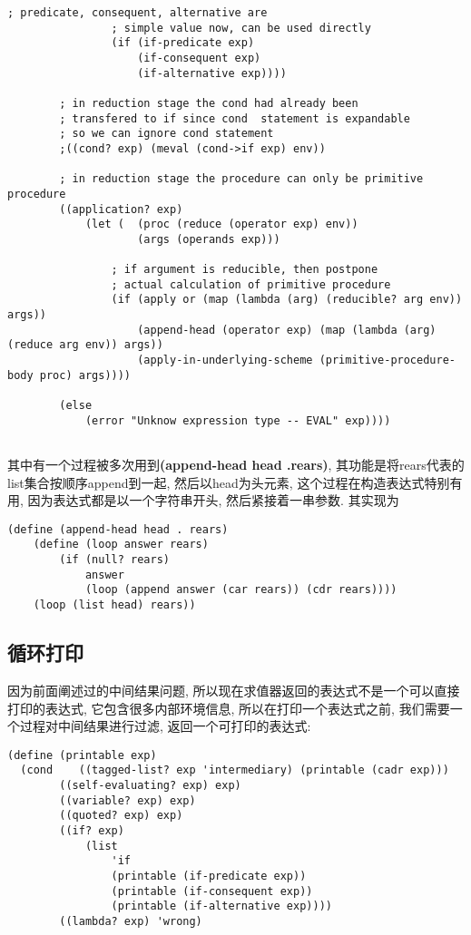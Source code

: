 \documentclass{article}
\begin{document}
\begin{CJK*}{UTF8}{gkai}
\begin{lstlisting}[basicstyle=\scriptsize\ttfamily\bfseries]
                ; predicate, consequent, alternative are 
                ; simple value now, can be used directly
                (if (if-predicate exp)
                    (if-consequent exp)
                    (if-alternative exp))))
                            
        ; in reduction stage the cond had already been 
        ; transfered to if since cond  statement is expandable
        ; so we can ignore cond statement
        ;((cond? exp) (meval (cond->if exp) env))
        
        ; in reduction stage the procedure can only be primitive procedure
        ((application? exp)
            (let (  (proc (reduce (operator exp) env))
                    (args (operands exp)))

                ; if argument is reducible, then postpone 
                ; actual calculation of primitive procedure
                (if (apply or (map (lambda (arg) (reducible? arg env)) args))
                    (append-head (operator exp) (map (lambda (arg) (reduce arg env)) args))
                    (apply-in-underlying-scheme (primitive-procedure-body proc) args))))

        (else
            (error "Unknow expression type -- EVAL" exp))))


\end{lstlisting}

其中有一个过程被多次用到{\bfseries \ttfamily (append-head head .rears)}, 其功能是将rears代表的list集合按顺序append到一起, 然后以head为头元素, 这个过程在构造表达式特别有用, 因为表达式都是以一个字符串开头, 然后紧接着一串参数. 其实现为

\begin{lstlisting}[basicstyle=\scriptsize\ttfamily\bfseries]
(define (append-head head . rears)
    (define (loop answer rears)
        (if (null? rears)
            answer
            (loop (append answer (car rears)) (cdr rears))))
    (loop (list head) rears))
\end{lstlisting}
    
\subsection{循环打印}

因为前面阐述过的中间结果问题, 所以现在求值器返回的表达式不是一个可以直接打印的表达式, 它包含很多内部环境信息, 所以在打印一个表达式之前, 我们需要一个过程对中间结果进行过滤, 返回一个可打印的表达式:

\begin{lstlisting}[basicstyle=\scriptsize\ttfamily\bfseries]
(define (printable exp)
  (cond    ((tagged-list? exp 'intermediary) (printable (cadr exp)))
        ((self-evaluating? exp) exp)
        ((variable? exp) exp)
        ((quoted? exp) exp)
        ((if? exp) 
            (list
                'if
                (printable (if-predicate exp))
                (printable (if-consequent exp))
                (printable (if-alternative exp))))
        ((lambda? exp) 'wrong)


\end{lstlisting}
\end{CJK*}
\end{document}
